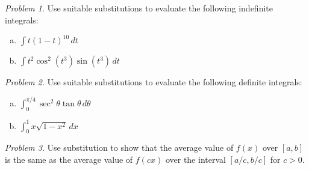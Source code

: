 \documentclass[11pt,twoside]{amsart}
\theoremstyle{plain}
\theoremstyle{remark}
\newtheorem{prob}{Problem}
\theoremstyle{definition}
\theoremstyle{definition}
\begin{document}
\begin{prob}
Use suitable substitutions to evaluate the following indefinite integrals:
\begin{enumerate}[(a)]
\item $\int t(1-t)^{10}\,dt$
\item $\int t^2\cos^2(t^3)\sin(t^3)\,dt$
\end{enumerate}
\end{prob}

\begin{prob}
Use suitable substitutions to evaluate the following definite integrals:
\begin{enumerate}[(a)]
\item $\int_0^{\pi/4} \sec^2\theta\tan\theta\,d\theta$
\item $\int_0^1 x\sqrt{1-x^2}\,dx$
\end{enumerate}
\end{prob}

\begin{prob}
Use substitution to show that the average value of $f(x)$ over $[a,b]$ is the same as the average value of $f(cx)$ over the interval $[a/c,b/c]$ for $c>0$.
\end{prob}
\end{document}
